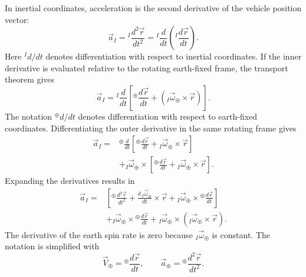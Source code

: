 In inertial coordinates, acceleration is the second derivative of the vehicle position
vector:
\begin{equation}
  \vec a_I
  ={}^{I}\!\frac{d^2\vec r}{dt^2}
  ={}^{I}\!\frac{d}{dt}
    \left({}^{I}\!\frac{d\vec r}{dt}\right).
  \label{eq:inertial-position-second-derivative}
\end{equation}
Here ${}^{I}d/dt$ denotes differentiation with respect to inertial coordinates. If
the inner derivative is evaluated relative to the rotating earth-fixed frame, the
transport theorem gives
\begin{equation}
  \vec a_I
  ={}^{I}\!\frac{d}{dt}
    \left[
      {}^{\oplus}\!\frac{d\vec r}{dt}
      +\left({}_{I}\vec\omega_{\oplus}\times\vec r\right)
    \right].
  \label{eq:inertial-derivative-earth-fixed-inner}
\end{equation}
The notation ${}^{\oplus}d/dt$ denotes differentiation with respect to earth-fixed
coordinates. Differentiating the outer derivative in the same rotating frame gives
\begin{equation}
  \begin{aligned}
  \vec a_I={}&
  {}^{\oplus}\!\frac{d}{dt}
    \left[
      {}^{\oplus}\!\frac{d\vec r}{dt}
      +{}_{I}\vec\omega_{\oplus}\times\vec r
    \right]\\
  &+{}_{I}\vec\omega_{\oplus}\times
    \left[
      {}^{\oplus}\!\frac{d\vec r}{dt}
      +{}_{I}\vec\omega_{\oplus}\times\vec r
    \right].
  \end{aligned}
  \label{eq:transport-theorem-expanded}
\end{equation}
Expanding the derivatives results in
\begin{equation}
  \begin{aligned}
  \vec a_I={}&
  \left[
    {}^{\oplus}\!\frac{d^2\vec r}{dt^2}
    +\frac{d\,{}_{I}\vec\omega_{\oplus}}{dt}\times\vec r
    +{}_{I}\vec\omega_{\oplus}\times
      {}^{\oplus}\!\frac{d\vec r}{dt}
  \right]\\
  &+{}_{I}\vec\omega_{\oplus}\times
      {}^{\oplus}\!\frac{d\vec r}{dt}
   +{}_{I}\vec\omega_{\oplus}\times
      \left({}_{I}\vec\omega_{\oplus}\times\vec r\right).
  \end{aligned}
  \label{eq:inertial-acceleration-expanded}
\end{equation}
The derivative of the earth spin rate is zero because
${}_{I}\vec\omega_{\oplus}$ is constant. The notation is simplified with
\begin{equation}
  \vec V_{\oplus}
    ={}^{\oplus}\!\frac{d\vec r}{dt},
  \qquad
  \vec a_{\oplus}
    ={}^{\oplus}\!\frac{d^2\vec r}{dt^2}.
  \label{eq:earth-relative-velocity-acceleration-definitions}
\end{equation}
